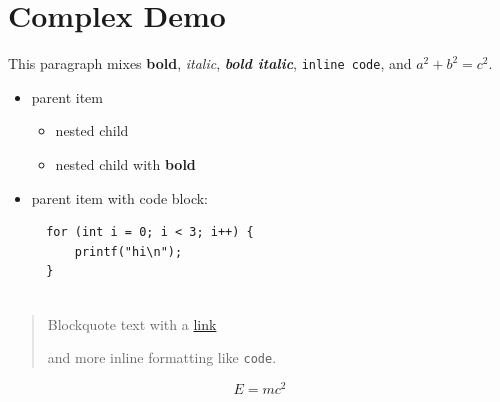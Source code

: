 \documentclass{article}
\begin{document}
\section{ Complex Demo}

This paragraph mixes \textbf{bold}, \emph{italic}, \textbf{\emph{bold italic}}, \texttt{inline code}, and $a^2 + b^2 = c^2$.

\begin{itemize}
\item  parent item
\begin{itemize}
\item  nested child
\item  nested child with \textbf{bold}
\end{itemize}


\item  parent item with code block:
\begin{verbatim}
  for (int i = 0; i < 3; i++) {
      printf("hi\n");
  }
  
\end{verbatim}


\end{itemize}

\begin{quote}
 Blockquote text with a \href{https://openai.com}{link}

 and more inline formatting like \texttt{code}.

\end{quote}

\[
E = mc^2
\]
\end{document}
